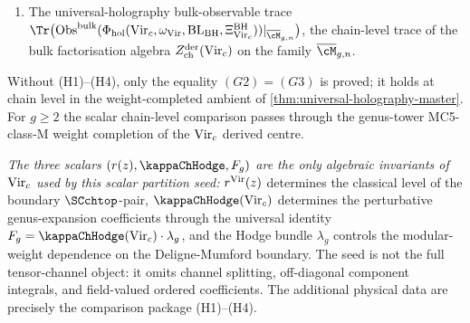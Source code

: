 \begin{theorem}
\begin{enumerate}
\[ \bigl(q^{L_{0} - c/24}; \overline{\cM}_{g, n}\bigr)
 \;=\;
 \exp\!\Bigl(\sum_{g' = 0}^{g} F_{g'} \,\beta^{2 g' - 2}\Bigr)
 \cdot q^{-c/24}
 \cdot \prod_{k = 2}^{\infty} (1 - q^{k})^{-1},
 \]
 with $F_{g'} = \kappaChHodge(\Vir_{c}) \cdot \lambda_{g'}^{\mathrm{FP}}
 = (c/2) \lambda_{g'}^{\mathrm{FP}}$ and $\beta = 2\pi \im \tau$, the
 shadow-free-energy genus series of the convergence dichotomy
 (\cref{thm:convergence-dichotomy}).
\item[(G3)] The universal-holography bulk-observable trace
 $\Tr\bigl(\mathrm{Obs}^{\mathrm{bulk}}(\Phihol(\Vir_{c},\omega_{\Vir},
 \mathrm{BL}_{\mathrm{BH}},\Xi_{\Vir_c}^{\mathrm{BH}}))
 |_{\overline{\cM}_{g, n}}\bigr)$, the chain-level trace of the
 bulk factorisation algebra
 $Z^{\mathrm{der}}_{\mathrm{ch}}(\mathrm{Vir}_{c})$ on the family
 $\overline{\cM}_{g, n}$.
\end{enumerate}
Without \textup{(H1)--(H4)}, only the equality $(G2) = (G3)$ is proved;
it holds at chain level in the
weight-completed ambient of
\cref{thm:universal-holography-master}. For $g \ge 2$ the scalar
chain-level comparison passes through the genus-tower MC5-class-M
weight completion of the $\mathrm{Vir}_{c}$ derived centre.

\emph{The three scalars $(r(z), \kappaChHodge, F_{g})$ are the only
algebraic invariants of $\mathrm{Vir}_{c}$ used by this scalar partition
seed:}
$r^{\mathrm{Vir}}(z)$ determines the classical level of the boundary
$\SCchtop$-pair, $\kappaChHodge(\Vir_c)$ determines the perturbative
genus-expansion coefficients through the universal identity
$F_{g} = \kappaChHodge(\Vir_c) \cdot
\lambda_{g}$, and the Hodge bundle $\lambda_{g}$ controls the
modular-weight dependence on the Deligne-Mumford boundary. The
seed is not the full tensor-channel object: it omits channel splitting,
off-diagonal component integrals, and field-valued ordered
coefficients. The additional physical data are precisely the comparison
package \textup{(H1)--(H4)}.
\end{theorem}

